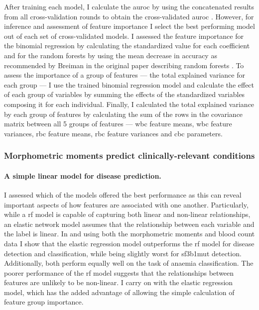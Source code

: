 After training each model, I calculate the \ac{auroc} by using the concatenated results from all cross-validation rounds to obtain the cross-validated \ac{auroc} \cite{Fawcett2006-mo}. However, for inference and assessment of feature importance I select the best performing model out of each set of cross-validated models. I assessed the feature importance for the binomial regression by calculating the standardized value for each coefficient and for the random forests by using the mean decrease in accuracy as recommended by Breiman in the original paper describing random forests \cite{Breiman2001-yz}. To assess the importance of a group of features --- the total explained variance for each group --- I use the trained binomial regression model and calculate the effect of each group of variables by summing the effects of the standardized variables composing it for each individual. Finally, I calculated the total explained variance by each group of features by calculating the sum of the rows in the covariance matrix between all 5 groups of features --- \ac{wbc} feature means, \ac{wbc} feature variances, \ac{rbc} feature means, \ac{rbc} feature variances and \ac{cbc} parameters.

\subsubsection{Morphometric moments predict clinically-relevant conditions}

\paragraph{A simple linear model for disease prediction.} I assessed which of the models offered the best performance as this can reveal important aspects of how features are associated with one another. Particularly, while a \ac{rf} model is capable of capturing both linear and non-linear relationships, an elastic network model assumes that the relationship between each variable and the label is linear. In  and using both the morphometric moments and blood count data I show that the elastic regression model outperforms the \ac{rf} model for disease detection and classification, while being slightly worst for \ac{sf3b1}mut detection. Additionally, both perform equally well on the task of anaemia classification. The poorer performance of the \ac{rf} model suggests that the relationships between features are unlikely to be non-linear. I carry on with the elastic regression model, which has the added advantage of allowing the simple calculation of feature group importance.

